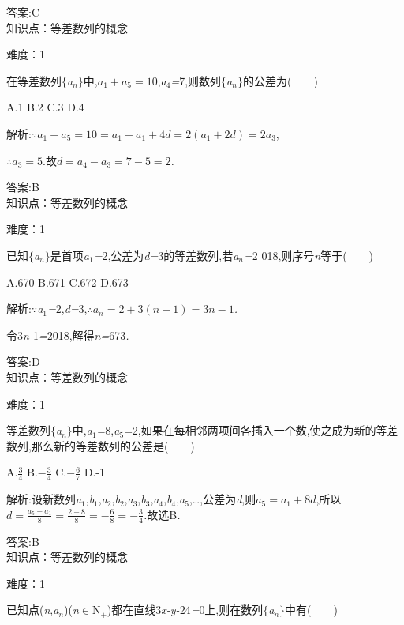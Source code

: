 \documentclass{article} %
\begin{document}
 答案:C \\

知识点：等差数列的概念

难度：1

 在等差数列$\mathrm{\{}$\textit{a${}_{n}$}$\mathrm{\}}$中,$a_1+a_5 = 10$,\textit{a}${}_{4}$\textit{=}7,则数列$\mathrm{\{}$\textit{a${}_{n}$}$\mathrm{\}}$的公差为(\textit{　　})

 A.1 B.2 C.3 D.4

 解析:$\because a_1+a_5 = 10=a_1+a_1+4d=2(a_1+2d)=2a_3$,

$\therefore a_3 = 5$.故$d =a_4-a_3 = 7-5=2$\textit{.}

 答案:B \\

知识点：等差数列的概念

难度：1

 已知$\mathrm{\{}$\textit{a${}_{n}$}$\mathrm{\}}$是首项\textit{a}${}_{1}$\textit{=}2,公差为\textit{d=}3的等差数列,若\textit{a${}_{n}$=}2 018,则序号\textit{n}等于(\textit{　　})

 A.670 B.671 C.672 D.673

 解析:\textit{$\because$a}${}_{1}$\textit{=}2,\textit{d=}3,$\therefore a_n = 2+3(n-1) = 3n-1$\textit{.}

令3\textit{n-}1\textit{=}2018,解得\textit{n=}673\textit{.}

 答案:D \\

知识点：等差数列的概念

难度：1

 等差数列$\mathrm{\{}$\textit{a${}_{n}$}$\mathrm{\}}$中,\textit{a}${}_{1}$\textit{=}8,\textit{a}${}_{5}$\textit{=}2,如果在每相邻两项间各插入一个数,使之成为新的等差数列,那么新的等差数列的公差是(\textit{　　})

 A.$\frac{3}{4}$ B.$-\frac{3}{4}$ C.$-\frac{6}{7}$ D.-1

 解析:设新数列\textit{a}${}_{1}$,\textit{b}${}_{1}$,\textit{a}${}_{2}$,\textit{b}${}_{2}$,\textit{a}${}_{3}$,\textit{b}${}_{3}$,\textit{a}${}_{4}$,\textit{b}${}_{4}$,\textit{a}${}_{5}$,{\dots},公差为\textit{d},则$a_5 = a_1 +8d$,所以$d = \frac{a_5 - a_1}{8} = \frac{2 -8 }{8}=-\frac{6}{8} = -\frac{3}{4}$\textit{.}故选B\textit{.}
 
 答案:B \\

知识点：等差数列的概念

难度：1

 已知点(\textit{n},\textit{a${}_{n}$})(\textit{n}$\mathrm{\in}$N\textit{${}_{+}$})都在直线3\textit{x-y-}24\textit{=}0上,则在数列$\mathrm{\{}$\textit{a${}_{n}$}$\mathrm{\}}$中有(\textit{　　})
\end{document}
